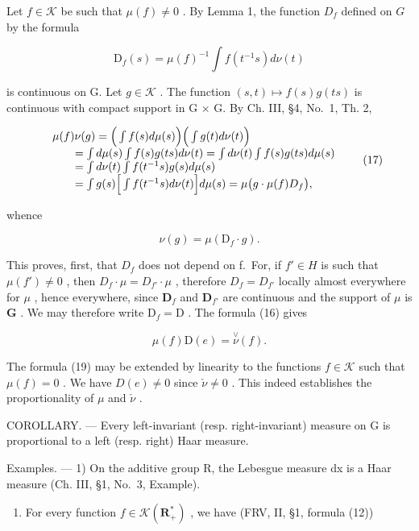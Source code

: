 Let \(f \in \mathcal{K}\) be such that \(\mu(f) \neq 0\) . By Lemma 1, the function \(D_f\) defined on \(G\) by the formula

\[
\mathrm{D} _ {f} (s) = \mu (f) ^ {- 1} \int f (t ^ {- 1} s) d \nu (t)\tag{16}
\]

is continuous on G. Let \(g \in \mathcal{K}\) . The function \((s, t) \mapsto f(s)g(ts)\) is continuous with compact support in G × G. By Ch. III, §4, No.~1, Th. 2,

\[
\begin{array}{r l} & {\mu (f) \nu (g) = \Big (\int f (s) d \mu (s) \Big) \Big (\int g (t) d \nu (t) \Big)} \\ & {\qquad = \int d \mu (s) \int f (s) g (t s) d \nu (t) = \int d \nu (t) \int f (s) g (t s) d \mu (s)} \\ & {\qquad = \int d \nu (t) \int f (t ^ {- 1} s) g (s) d \mu (s)} \\ & {\qquad = \int g (s) \Big [ \int f (t ^ {- 1} s) d \nu (t) \Big ] d \mu (s) = \mu \big (g \cdot \mu (f) D _ {f} \big),} \end{array}\tag{17}
\]

whence

\[
\nu (g) = \mu (\mathrm{D} _ {f} \cdot g).\tag{18}
\]

This proves, first, that \(D_{f}\) does not depend on f.~For, if \(f' \in H\) is such that \(\mu(f') \neq 0\) , then \(D_{f} \cdot \mu = D_{f'} \cdot \mu\) , therefore \(D_{f} = D_{f'}\) locally almost everywhere for \(\mu\) , hence everywhere, since \(\mathbf{D}_f\) and \(\mathbf{D}_{f'}\) are continuous and the support of \(\mu\) is \(\mathbf{G}\) . We may therefore write \(\mathrm{D}_f = \mathrm{D}\) . The formula (16) gives

\[
\mu (f) \mathrm{D} (e) = \stackrel {\vee} {\nu} (f).\tag{19}
\]

The formula (19) may be extended by linearity to the functions \(f \in \mathcal{K}\) such that \(\mu(f) = 0\) . We have \(D(e) \neq 0\) since \(\check{\nu} \neq 0\) . This indeed establishes the proportionality of \(\mu\) and \(\check{\nu}\) .

COROLLARY. --- Every left-invariant (resp. right-invariant) measure on G is proportional to a left (resp. right) Haar measure.

Examples. --- 1) On the additive group R, the Lebesgue measure dx is a Haar measure (Ch. III, §1, No.~3, Example).

\begin{enumerate}
\def\labelenumi{\arabic{enumi})}
\setcounter{enumi}{1}
\tightlist
\item
  For every function \(f \in \mathcal{K}(\mathbf{R}_+^*)\) , we have (FRV, II, §1, formula (12))
\end{enumerate}

